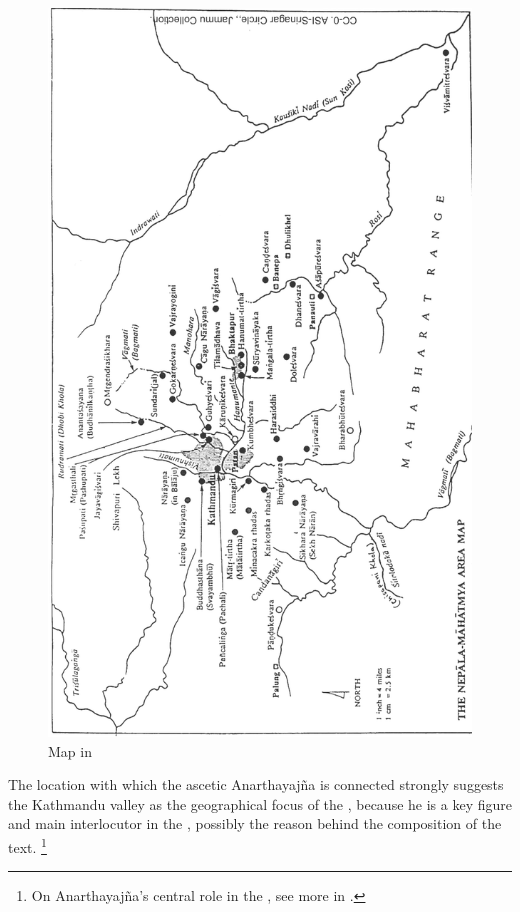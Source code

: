 \begin{figure}[!]
\includegraphics[scale=.40]{images/map_in_jayaraj.png}
\caption[Map in ]{Map in 
\label{fig:map02}}
\end{figure}


The location with which the ascetic Anarthayajña
is connected strongly suggests the Kathmandu 
valley as the geographical focus of the \VSS,
because he is a key figure and 
main interlocutor in the \VSS,
possibly the reason behind the composition of the text.%
	\footnote{On Anarthayajña's central role in the \VSS,
			see more in .}



